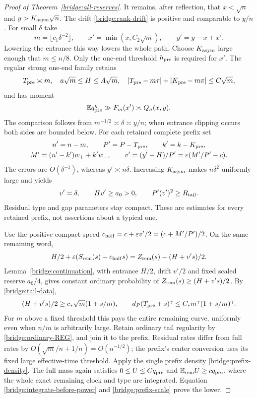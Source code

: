 \begin{proof}[Proof of Theorem~\ref{bridge:all-reserves}]
It remains, after reflection, that $x<\sqrt n$ and
$y>K_{\rm asym}\sqrt n$. The drift \eqref{bridge:rank-drift} is
positive and comparable to $y/n$. For small $\delta$ take
\[
 m=\lfloor c_1\delta^{-2}\rfloor,\qquad
 x'=\min(x,C_2\sqrt m),\qquad y'=y-x+x'.
\]
Lowering the entrance this way lowers the whole path. Choose
$K_{\rm asym}$ large enough that $m\le n/8$. Only the one-end
threshold $h_{\rm pre}$ is required for $x'$. The regular strong
one-end family retains
\[
 T_{\rm pre}\asymp m,\quad a\sqrt m\le H\le A\sqrt m,
 \quad |T_{\rm pre}-m\tau|+|K_{\rm pre}-m\pi|\le C\sqrt m,
\]
and has moment
\begin{equation}
 \mathbb E q_{\rm pre}^\eta
      \gg F_m(x')\asymp Q_n(x,y).\label{bridge:prefix-scale}
\end{equation}
The comparison follows from $m^{-1/2}\asymp\delta\asymp y/n$;
when entrance clipping occurs both sides are bounded below.
For each retained complete prefix set
\[
 \begin{gathered}
 n'=n-m,\qquad P'=P-T_{\rm pre},\qquad k'=k-K_{\rm pre},\\
 M'=(n'-k')w_++k'w_-,\qquad
 v'=(y'-H)/P'=\varepsilon(M'/P'-c).
 \end{gathered}
\]
The errors are $O(\delta^{-1})$, whereas $y'\asymp n\delta$.
Increasing $K_{\rm asym}$ makes $n\delta^2$ uniformly large and yields
\begin{equation}
 v'\asymp\delta,\qquad Hv'\ge a_0>0,
       \qquad P'(v')^2\ge R_{\rm tail}.
 \label{bridge:tail-data}
\end{equation}
Residual type and gap parameters stay compact. These are estimates
for every retained prefix, not assertions about a typical one.

Use the positive compact speed
$c_{\rm half}=c+\varepsilon v'/2=(c+M'/P')/2$.
On the same remaining word,
\[
 H/2+\varepsilon(S_{\rm rem}(s)-c_{\rm half}s)
 =Z_{\rm rem}(s)-(H+v's)/2.
\]
Lemma~\ref{bridge:continuation}, with entrance $H/2$, drift $v'/2$
and fixed scaled reserve $a_0/4$, gives constant ordinary probability
of $Z_{\rm rem}(s)\ge(H+v's)/2$. By \eqref{bridge:tail-data},
\[
 (H+v's)/2\ge c_*\sqrt m(1+s/m),\qquad
 d_P(T_{\rm pre}+s)^\gamma
          \le C_*m^\gamma(1+s/m)^\gamma.
\]
For $m$ above a fixed threshold this pays the entire remaining curve,
uniformly even when $n/m$ is arbitrarily large. Retain ordinary tail
regularity by \eqref{bridge:ordinary-REG}, and join it to the prefix.
Residual rates differ from full rates by
$O(\sqrt m/n+1/n)=O(n^{-1/2})$; the prefix's center conversion uses
its fixed large effective-time threshold. Apply the single prefix
density \eqref{bridge:prefix-density}. The full mass again satisfies
$0\le U\le Cq_{\rm pre}$ and
$\mathbb E_{\rm rem}U\ge cq_{\rm pre}$, where the whole exact
remaining clock and type are integrated. Equation
\eqref{bridge:integrate-before-power} and
\eqref{bridge:prefix-scale} prove the lower.


\end{proof}
